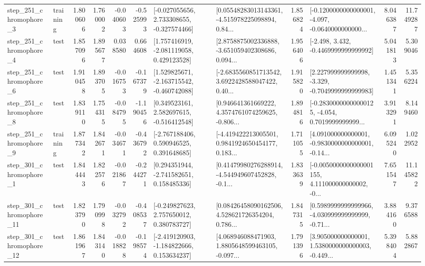 \begin{tabular}{llrrrrllrlrr}
   step\_251\_chromophore\_3 &  training &      1.800606 &    1.760002 &     -0.040603 & -0.525993 &   [-0.027055656, 2.733308655, -0.327574466] &  [0.05548283013143361, -4.515978225098894, 0.84... &       1.856824 &  [-0.1200000000000001, -4.097, -0.0640000000000... &            8.046387 &         11.749287 \\
   step\_251\_chromophore\_4 &      test &      1.857096 &    1.895677 &      0.038580 &  0.664608 &    [1.757416919, -2.081119058, 0.429123528] &  [2.8758875002336888, -3.651059402308686, 0.094... &       1.956406 &               [-2.498, 3.432, -0.4469999999999992] &            5.041813 &          5.309046 \\
   step\_251\_chromophore\_6 &      test &      1.910458 &    1.893705 &     -0.016753 & -0.167379 &   [1.529825671, -2.163715542, -0.460742088] &  [-2.6835560851713542, 3.6922428588047422, 0.40... &       1.915820 &   [2.227999999999998, -3.329, -0.7049999999999983] &            1.451341 &          5.356224 \\
   step\_251\_chromophore\_8 &      test &      1.839110 &    1.754315 &     -0.084795 & -1.190456 &    [0.349523161, 2.582697615, -0.516412548] &  [0.946641361669222, 4.3574761074259625, -0.806... &       1.894816 &  [-0.28300000000000125, -4.054, 0.7019999999999... &            3.913291 &          8.149460 \\
   step\_251\_chromophore\_9 &  training &      1.877342 &    1.842671 &     -0.034671 & -0.436792 &    [-2.767188406, 0.590946525, 0.391648685] &  [-4.419422213005501, 0.9841924650454177, 0.183... &       1.711055 &  [4.091000000000001, -0.9830000000000001, -0.14... &            6.095240 &          1.022952 \\
   step\_301\_chromophore\_1 &      test &      1.844443 &    1.822576 &     -0.021867 & -0.244271 &    [0.294351944, -2.741582651, 0.158485336] &  [0.41479980276288914, -4.544949607452828, -0.1... &       1.833639 &  [-0.0050000000000001155, 4.111000000000002, -0... &            7.651547 &         11.145822 \\
  step\_301\_chromophore\_11 &      test &      1.823790 &    1.790998 &     -0.032792 & -0.408537 &    [-0.249827623, 2.757650012, 0.380783727] &  [0.08426458090162506, 4.528621726354204, 0.786... &       1.847315 &  [0.5989999999999966, -4.030999999999999, -0.71... &            3.884160 &          9.376588 \\
  step\_301\_chromophore\_12 &      test &      1.861967 &    1.843140 &     -0.018828 & -0.198574 &   [-2.419120903, -1.184822666, 0.153634237] &  [4.068946088471903, 1.8805648599463105, -0.097... &       1.791396 &  [3.905000000000001, 1.5380000000000003, -0.449... &            5.398404 &          5.882867 \\

\end{tabular}
